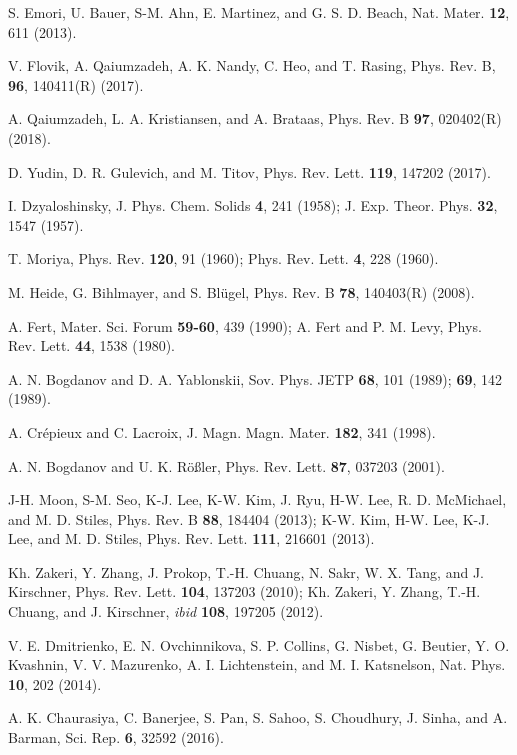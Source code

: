 \documentclass[aps,prl,twocolumn,amsmath,amssymb,superscriptaddress]{revtex4}%
\begin{document}
\begin{thebibliography}{9}
S. Emori, U. Bauer, S-M. Ahn, E. Martinez, and G. S. D. Beach, Nat. Mater. \textbf{12}, 611 (2013).

V. Flovik, A. Qaiumzadeh, A. K. Nandy, C. Heo, and T. Rasing,  Phys. Rev. B, \textbf{96}, 140411(R) (2017).

A. Qaiumzadeh, L. A. Kristiansen, and A. Brataas, Phys. Rev. B \textbf{97}, 020402(R) (2018).

D. Yudin, D. R. Gulevich, and M. Titov, Phys. Rev. Lett. \textbf{119}, 147202 (2017).

I. Dzyaloshinsky, J. Phys. Chem. Solids \textbf{4}, 241 (1958); J. Exp. Theor. Phys. \textbf{32}, 1547 (1957).

T. Moriya, Phys. Rev. \textbf{120}, 91 (1960); Phys. Rev. Lett. \textbf{4}, 228 (1960).

M. Heide, G. Bihlmayer, and S. Bl\"{u}gel, Phys. Rev. B \textbf{78}, 140403(R) (2008).

A. Fert, Mater. Sci. Forum \textbf{59-60}, 439 (1990); A. Fert and P. M. Levy, Phys. Rev. Lett.  \textbf{44}, 1538 (1980).

A. N. Bogdanov and D. A. Yablonskii, Sov. Phys. JETP \textbf{68}, 101 (1989); \textbf{69}, 142 (1989).

A. Cr\'{e}pieux and C. Lacroix, J. Magn. Magn. Mater. \textbf{182}, 341 (1998).

A. N. Bogdanov and U. K. R\"{o}{\ss}ler, Phys. Rev. Lett. \textbf{87}, 037203 (2001).

J-H. Moon, S-M. Seo, K-J. Lee, K-W. Kim, J. Ryu, H-W. Lee, R. D. McMichael, and M. D. Stiles, Phys. Rev. B \textbf{88}, 184404 (2013); K-W. Kim, H-W. Lee, K-J. Lee, and M. D. Stiles, Phys. Rev. Lett. \textbf{111}, 216601 (2013).

Kh. Zakeri, Y. Zhang, J. Prokop, T.-H. Chuang, N. Sakr, W. X. Tang, and J. Kirschner, Phys. Rev. Lett. \textbf{104}, 137203 (2010); Kh. Zakeri, Y. Zhang, T.-H. Chuang, and J. Kirschner, \textit{ibid} \textbf{108}, 197205 (2012).

V. E. Dmitrienko, E. N. Ovchinnikova, S. P. Collins, G. Nisbet, G. Beutier, Y. O. Kvashnin, V. V. Mazurenko, A. I. Lichtenstein, and M. I. Katsnelson, Nat. Phys. \textbf{10}, 202 (2014).

A. K. Chaurasiya, C. Banerjee, S. Pan, S. Sahoo, S. Choudhury, J. Sinha, and A. Barman, Sci. Rep. \textbf{6}, 32592 (2016).


\end{thebibliography}
\end{document}
